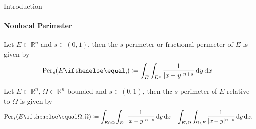 \documentclass[9pt]{beamer}
\begin{document}
\begin{frame}{Introduction}
  \framesubtitle{Nonlocal Perimeter}


  \begin{definition}
  \label{def:002}
  Let \( E \subset \mathbb{R}^n \) and \( s \in (0, 1) \), then the \( s \)-perimeter
	or fractional perimeter of \( E \) is given by
	\begin{gather*}
		\Per{s}{E}{} \coloneqq \int_E \int_{E^c} \frac{1}{\lvert x - y \rvert^{n + s}} \dd{y} \dd{x}.
	\end{gather*}
  \end{definition}

  \begin{definition}
    \label{def:006}
    Let \( E \subset \mathbb{R}^n \), \( \Omega \subset \mathbb{R}^n \) bounded and \(
	  s \in (0, 1) \), then the \( s \)-perimeter of \( E \) relative to \( \Omega \) is given by
	  \begin{gather*}
		  \Per{s}{E}{\Omega} \coloneqq \int_{E \cap \Omega}  \int_{E^c} \frac{1}{\lvert x - y \rvert^{n + s}} \dd{y} \dd{x} + \int_{E \setminus \Omega}  \int_{\Omega \setminus E} \frac{1}{\lvert x - y \rvert^{n + s}} \dd{y} \dd{x}.
    \end{gather*}
  \end{definition}

\end{frame}

\end{document}
